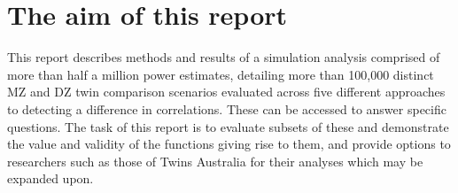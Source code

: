 \section{The aim of this report}
This report describes methods and results of a simulation analysis comprised of more than half a million power estimates, detailing more than 100,000 distinct MZ and DZ twin comparison scenarios evaluated across five different approaches to detecting a difference in correlations.  These can be accessed to answer specific questions.  The task of this report is to evaluate subsets of these and demonstrate the value and validity of the functions giving rise to them, and provide options to researchers such as those of Twins Australia for their analyses which may be expanded upon.